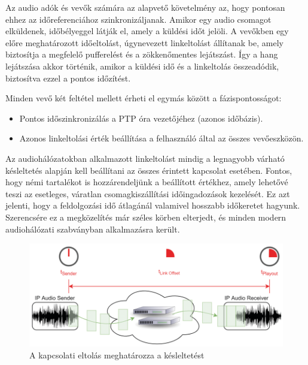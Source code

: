 Az audio adók és vevők számára az alapvető követelmény az, hogy pontosan ehhez az időreferenciához szinkronizáljanak. 
Amikor egy audio csomagot elküldenek, időbélyeggel látják el, amely a küldési időt jelöli. 
A vevőkben egy előre meghatározott időeltolást, úgynevezett linkeltolást állítanak be, amely biztosítja a 
megfelelő pufferelést és a zökkenőmentes lejátszást. Így a hang lejátszása akkor történik, amikor a küldési 
idő és a linkeltolás összeadódik, biztosítva ezzel a pontos időzítést. \newline

Minden vevő két feltétel mellett érheti el egymás között a fázispontosságot:
\begin{itemize}
	\item Pontos időszinkronizálás a PTP óra vezetőjéhez (azonos időbázis).
	\item Azonos linkeltolási érték beállítása a felhasználó által az összes vevőeszközön.
\end{itemize}
Az audiohálózatokban alkalmazott linkeltolást mindig a legnagyobb várható késleltetés alapján kell 
beállítani az összes érintett kapcsolat esetében. Fontos, hogy némi tartalékot is hozzárendeljünk a 
beállított értékhez, amely lehetővé teszi az esetleges, váratlan csomagkiszállítási időingadozások kezelését. 
Ez azt jelenti, hogy a feldolgozási idő átlagánál valamivel hosszabb időkeretet hagyunk. 
Szerencsére ez a megközelítés már széles körben elterjedt, és minden modern audiohálózati szabványban alkalmazásra került.
\begin{figure}[H]
	\centering
	\includegraphics[width=\linewidth, keepaspectratio]{figures/link_offset_latency.png}
	\caption{A kapcsolati eltolás meghatározza a késleltetést \cite{AHNERT2023}}
	\label {fig:link_offset_latency}
\end{figure}
